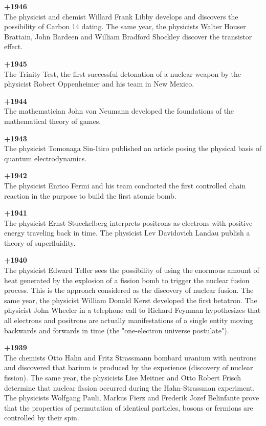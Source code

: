 \textbf{+1946}\\
The physicist and chemist Willard Frank Libby develops and discovers the possibility of Carbon 14 dating. The same year, the physicists Walter Houser Brattain, John Bardeen and William Bradford Shockley discover the transistor effect.

\textbf{+1945}\\
The Trinity Test, the first successful detonation of a nuclear weapon by the physicist Robert Oppenheimer and his team in New Mexico.

\textbf{+1944}\\
The mathematician John von Neumann developed the foundations of the mathematical theory of games.

\textbf{+1943}\\
The physicist Tomonaga Sin-Itiro published an article posing the physical basis of quantum electrodynamics.

\textbf{+1942}\\
The physicist Enrico Fermi and his team conducted the first controlled chain reaction in the purpose to build the first atomic bomb.

\textbf{+1941}\\
The physicist Ernst Stueckelberg interprets positrons as electrons with positive energy traveling back in time. The physicist Lev Davidovich Landau publish a theory of superfluidity.

\textbf{+1940}\\
The physicist Edward Teller sees the possibility of using the enormous amount of heat generated by the explosion of a fission bomb to trigger the nuclear fusion process. This is the approach considered as the discovery of nuclear fusion. The same year, the physicist William Donald Kerst developed the first betatron. The physicist John Wheeler in a telephone call to Richard Feynman hypothesizes that all electrons and positrons are actually manifestations of a single entity moving backwards and forwards in time (the "one-electron universe postulate").

\textbf{+1939}\\
The chemists Otto Hahn and Fritz Strassmann bombard uranium with neutrons and discovered that barium is produced by the experience (discovery of nuclear fission). The same year, the physicists Lise Meitner and Otto Robert Frisch determine that nuclear fission occurred during the Hahn-Strassman experiment. The physicists Wolfgang Pauli, Markus Fierz and Frederik Jozef Belinfante prove that the properties of permutation of identical particles, bosons or fermions are controlled by their spin.

